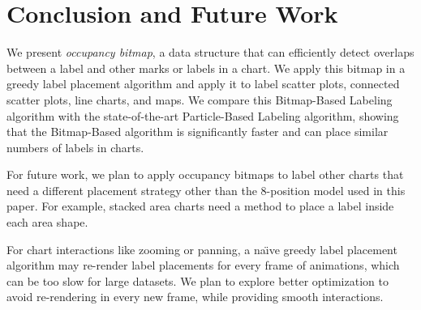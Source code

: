\section{Conclusion and Future Work}

We present \emph{occupancy bitmap}, a data structure that can efficiently detect overlaps between a label and other marks or labels in a chart.
We apply this bitmap in a greedy label placement algorithm and apply it to label scatter plots, connected scatter plots, 
line charts, and maps.
We compare this Bitmap-Based Labeling algorithm with the state-of-the-art Particle-Based Labeling algorithm,
showing that the Bitmap-Based algorithm is significantly faster and can place similar numbers of labels in charts.

For future work, we plan to apply occupancy bitmaps to label other charts that 
need a different placement strategy other than the 8-position model used in this paper. 
For example, stacked area charts need a method to place a label inside each area shape.

For chart interactions like zooming or panning, a na{\"\i}ve greedy label placement algorithm may re-render label placements 
for every frame of animations, which can be too slow for large datasets.
We plan to explore better optimization to avoid re-rendering in every new frame,
while providing smooth interactions.
